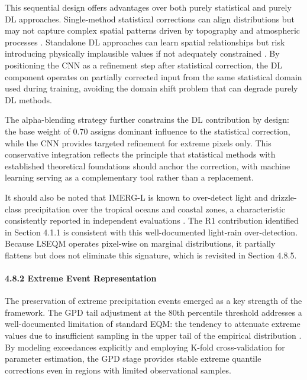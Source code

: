 \documentclass[
]{article}
\begin{document}
This sequential design offers advantages over both purely statistical
and purely DL approaches. Single-method statistical corrections can
align distributions but may not capture complex spatial patterns driven
by topography and atmospheric processes \cite{ref8,ref44}. Standalone DL
approaches can learn spatial relationships but risk introducing
physically implausible values if not adequately constrained \cite{ref9,ref12}.
By positioning the CNN as a refinement step after statistical
correction, the DL component operates on partially corrected input from
the same statistical domain used during training, avoiding the domain
shift problem that can degrade purely DL methods.

The alpha-blending strategy further constrains the DL contribution by
design: the base weight of 0.70 assigns dominant influence to the
statistical correction, while the CNN provides targeted refinement for
extreme pixels only. This conservative integration reflects the
principle that statistical methods with established theoretical
foundations should anchor the correction, with machine learning serving
as a complementary tool rather than a replacement.

It should also be noted that IMERG-L is known to over-detect light and
drizzle-class precipitation over the tropical oceans and coastal zones,
a characteristic consistently reported in independent evaluations
\cite{ref31,ref32}. The R1 contribution identified in Section 4.1.1 is
consistent with this well-documented light-rain over-detection. Because
LSEQM operates pixel-wise on marginal distributions, it partially
flattens but does not eliminate this signature, which is revisited in
Section 4.8.5.

\paragraph{4.8.2 Extreme Event
Representation}\label{extreme-event-representation}

The preservation of extreme precipitation events emerged as a key
strength of the framework. The GPD tail adjustment at the 80th
percentile threshold addresses a well-documented limitation of standard
EQM: the tendency to attenuate extreme values due to insufficient
sampling in the upper tail of the empirical distribution \cite{ref11}. By
modeling exceedances explicitly and employing K-fold cross-validation
for parameter estimation, the GPD stage provides stable extreme quantile
corrections even in regions with limited observational samples.
\end{document}

